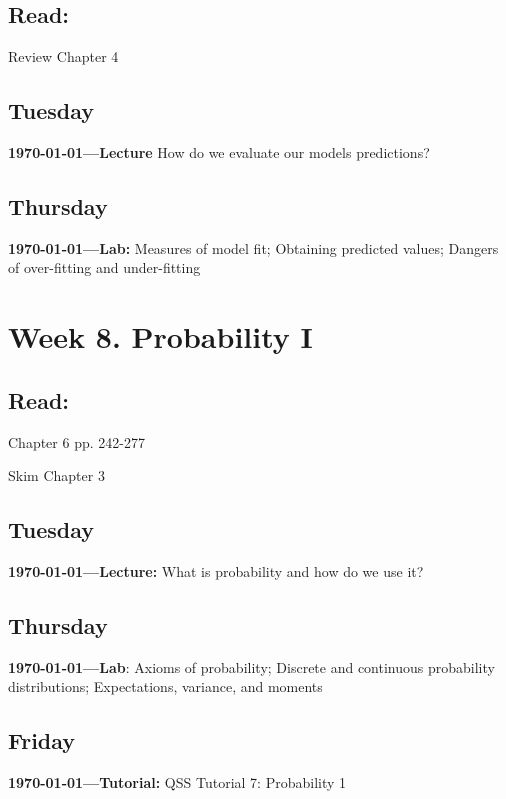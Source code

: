\subsection{Read:}

Review \citet{Imai2022-pm} Chapter 4


\subsection{Tuesday} \textbf{\today---Lecture} How do we evaluate our models predictions?

\AdvanceDate[2]

\subsection{Thursday} \textbf{\today---Lab:} Measures of model fit; Obtaining predicted values; Dangers of over-fitting and under-fitting


\AdvanceDate[5]

\vspace{2em}

\section{Week 8. Probability I}

\subsection{Read:}

\citet{Imai2022-pm} Chapter 6 pp. 242-277

\cite{levendusky2009partisan} Skim Chapter 3

\subsection{Tuesday} \textbf{\today---Lecture:} What is probability and how do we use it?
\AdvanceDate[2]

\subsection{Thursday} \textbf{\today---Lab}: Axioms of probability; Discrete and continuous probability distributions; Expectations, variance, and moments 

\AdvanceDate[1]
\subsection{Friday} \textbf{\today---Tutorial:} QSS Tutorial 7: Probability 1
\AdvanceDate[2]


